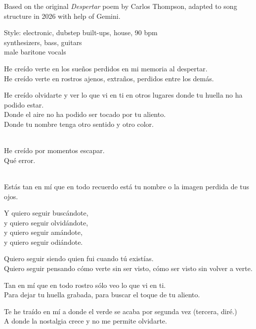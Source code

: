 

\begin{notes}
Based on the original \emph{Despertar} poem by Carlos Thompson, adapted to song structure in 2026 with help of Gemini.
\end{notes}
\begin{style}
Style: electronic, dubstep built-ups, house, 90 bpm\\
synthesizers, bass, guitars\\
male baritone vocals
\end{style}
\begin{lyrics}
He creído verte en los sueños perdidos en mi memoria al despertar.\\
He creído verte en rostros ajenos, extraños, perdidos entre los demás.

He creído olvidarte y ver lo que vi en ti en otros lugares donde tu huella no ha podido estar.\\
Donde el aire no ha podido ser tocado por tu aliento.\\
Donde tu nombre tenga otro sentido y otro color.

\\
He creído por momentos escapar.\\
Qué error.

\\
Estás tan en mí que en todo recuerdo está tu nombre o la imagen perdida de tus ojos.

Y quiero seguir buscándote,\\
y quiero seguir olvidándote,\\
y quiero seguir amándote,\\
y quiero seguir odiándote.

Quiero seguir siendo quien fui cuando tú existías.\\
Quiero seguir pensando cómo verte sin ser visto, cómo ser visto sin volver a verte.

Tan en mí que en todo rostro sólo veo lo que vi en ti.\\
Para dejar tu huella grabada, para buscar el toque de tu aliento.

Te he traído en mí a donde el verde se acaba por segunda vez (tercera, diré.)\\
A donde la nostalgia crece y no me permite olvidarte.


\end{lyrics}
